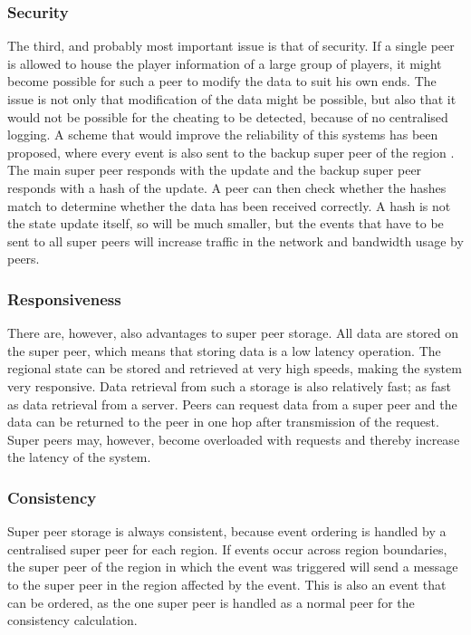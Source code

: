 \documentclass[journal,oneside,a4paper,onecolumn]{IEEEtran}
\begin{document}
\subsubsection{Security}
The third, and probably most important issue is that of security. If a single peer is allowed to house the player information of a large group of players, it might become possible for such a peer to modify the data to suit his own ends. The issue is not only that modification of the data might be possible, but also that it would not be possible for the cheating to be detected, because of no centralised logging. A scheme that would improve the reliability of this systems has been proposed, where every event is also sent to the backup super peer of the region \cite{past_storage_focus}. The main super peer responds with the update and the backup super peer responds with a hash of the update. A peer can then check whether the hashes match to determine whether the data has been received correctly. A hash is not the state update itself, so will be much smaller, but the events that have to be sent to all super peers will increase traffic in the network and bandwidth usage by peers.

\subsubsection{Responsiveness}
There are, however, also advantages to super peer storage. All data are stored on the super peer, which means that storing data is a low latency operation. The regional state can be stored and retrieved at very high speeds, making the system very responsive. Data retrieval from such a storage is also relatively fast; as fast as data retrieval from a server. Peers can request data from a super peer and the data can be returned to the peer in one hop after transmission of the request. Super peers may, however, become overloaded with requests and thereby increase the latency of the system.

\subsubsection{Consistency}
Super peer storage is always consistent, because event ordering is handled by a centralised super peer for each region. If events occur across region boundaries, the super peer of the region in which the event was triggered will send a message to the super peer in the region affected by the event. This is also an event that can be ordered, as the one super peer is handled as a normal peer for the consistency calculation.
\end{document}

